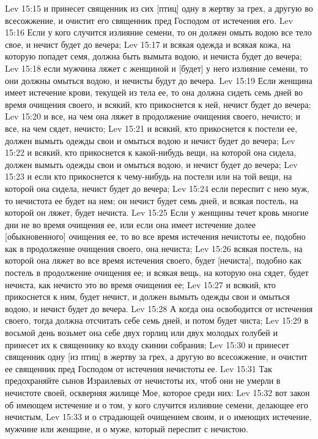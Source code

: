 Lev 15:15  и принесет священник из сих [птиц] одну в жертву за грех, а другую во всесожжение, и очистит его священник пред Господом от истечения его.
Lev 15:16  Если у кого случится излияние семени, то он должен омыть водою все тело свое, и нечист будет до вечера;
Lev 15:17  и всякая одежда и всякая кожа, на которую попадет семя, должна быть вымыта водою, и нечиста будет до вечера;
Lev 15:18  если мужчина ляжет с женщиной и [будет] у него излияние семени, то они должны омыться водою, и нечисты будут до вечера.
Lev 15:19  Если женщина имеет истечение крови, текущей из тела ее, то она должна сидеть семь дней во время очищения своего, и всякий, кто прикоснется к ней, нечист будет до вечера;
Lev 15:20  и все, на чем она ляжет в продолжение очищения своего, нечисто; и все, на чем сядет, нечисто;
Lev 15:21  и всякий, кто прикоснется к постели ее, должен вымыть одежды свои и омыться водою и нечист будет до вечера;
Lev 15:22  и всякий, кто прикоснется к какой-нибудь вещи, на которой она сидела, должен вымыть одежды свои и омыться водою, и нечист будет до вечера;
Lev 15:23  и если кто прикоснется к чему-нибудь на постели или на той вещи, на которой она сидела, нечист будет до вечера;
Lev 15:24  если переспит с нею муж, то нечистота ее будет на нем; он нечист будет семь дней, и всякая постель, на которой он ляжет, будет нечиста.
Lev 15:25  Если у женщины течет кровь многие дни не во время очищения ее, или если она имеет истечение долее [обыкновенного] очищения ее, то во все время истечения нечистоты ее, подобно как в продолжение очищения своего, она нечиста;
Lev 15:26  всякая постель, на которой она ляжет во все время истечения своего, будет [нечиста], подобно как постель в продолжение очищения ее; и всякая вещь, на которую она сядет, будет нечиста, как нечисто это во время очищения ее;
Lev 15:27  и всякий, кто прикоснется к ним, будет нечист, и должен вымыть одежды свои и омыться водою, и нечист будет до вечера.
Lev 15:28  А когда она освободится от истечения своего, тогда должна отсчитать себе семь дней, и потом будет чиста;
Lev 15:29  в восьмой день возьмет она себе двух горлиц или двух молодых голубей и принесет их к священнику ко входу скинии собрания;
Lev 15:30  и принесет священник одну [из птиц] в жертву за грех, а другую во всесожжение, и очистит ее священник пред Господом от истечения нечистоты ее.
Lev 15:31  Так предохраняйте сынов Израилевых от нечистоты их, чтоб они не умерли в нечистоте своей, оскверняя жилище Мое, которое среди них:
Lev 15:32  вот закон об имеющем истечение и о том, у кого случится излияние семени, делающее его нечистым,
Lev 15:33  и о страдающей очищением своим, и о имеющих истечение, мужчине или женщине, и о муже, который переспит с нечистою.
